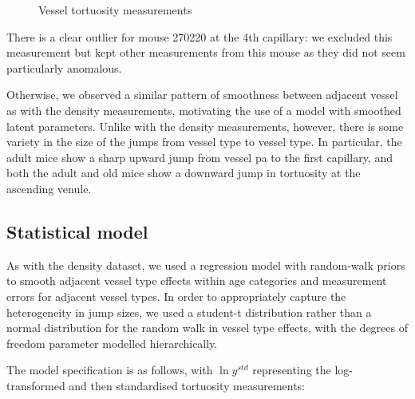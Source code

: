 \documentclass[
  letterpaper,
  DIV=11,
  numbers=noendperiod,
  oneside]{scrartcl}
\theoremstyle{plain}
\theoremstyle{remark}
\begin{document}
\begin{figure}


\caption{\label{fig-tortuosity-measurements}Vessel tortuosity
measurements}

\end{figure}%

There is a clear outlier for mouse 270220 at the 4th capillary: we
excluded this measurement but kept other measurements from this mouse as
they did not seem particularly anomalous.

Otherwise, we observed a similar pattern of smoothness between adjacent
vessel as with the density measurements, motivating the use of a model
with smoothed latent parameters. Unlike with the density measurements,
however, there is some variety in the size of the jumps from vessel type
to vessel type. In particular, the adult mice show a sharp upward jump
from vessel pa to the first capillary, and both the adult and old mice
show a downward jump in tortuosity at the ascending venule.

\subsection{Statistical model}\label{sec-tortuosity-model}

As with the density dataset, we used a regression model with random-walk
priors to smooth adjacent vessel type effects within age categories and
measurement errors for adjacent vessel types. In order to appropriately
capture the heterogeneity in jump sizes, we used a student-t
distribution rather than a normal distribution for the random walk in
vessel type effects, with the degrees of freedom parameter modelled
hierarchically.

The model specification is as follows, with \(\ln{y}^{std}\)
representing the log-transformed and then standardised tortuosity
measurements:
\end{document}
